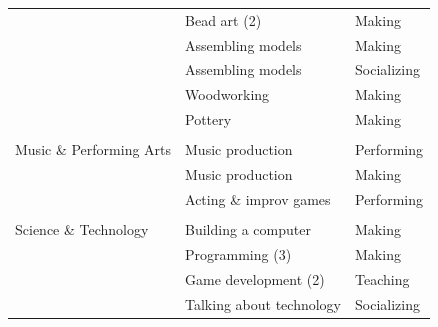 \begin{table}[t!]
\begin{tabular}{lll}
                         & Bead art (2)                                    & Making                                                                    \\
                         & Assembling models                               & Making                                                                    \\
                         & Assembling models                               & Socializing                                                               \\
                         & Woodworking                                     & Making                                                                    \\
                         & Pottery                                         & Making                                                                    \\
                         &                                                 &                                                                           \\
Music \& Performing Arts & Music production                                & Performing                                                                \\
                         & Music production                                & Making                                                                    \\
                         & Acting \& improv games                          & Performing                                                                \\
                         &                                                 &                                                                           \\
Science \& Technology    & Building a computer                             & Making                                                                    \\
                         & Programming (3)                                 & Making                                                                    \\
                         & Game development (2)                            & Teaching                                                                  \\
                         & Talking about technology                        & Socializing                                                              
\end{tabular}
\end{table}

